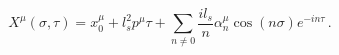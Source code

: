 \begin{equation}
X^\mu (\sigma, \tau) = x_0^\mu + l_s^2 p^\mu \tau +
\sum_{n \neq 0}
\frac{i l_s}{n}  \alpha^\mu_n \cos (n \sigma) e^{-in \tau}\,.
\label{eq:mode-decomposition}
\end{equation}

